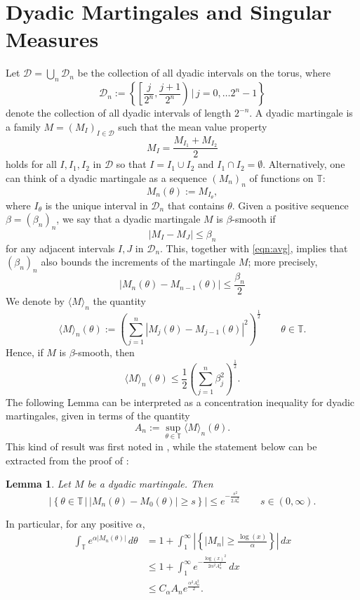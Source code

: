\documentclass{birkjour}
\numberwithin{equation}{section}
\theoremstyle{plain}
\newtheorem{lemma}[theo]{Lemma}
\theoremstyle{definition}
\newcommand{\T}{\mathbb{T}}
\newcommand{\1}{\mathds{1}}
\newcommand{\charM}{\langle M\rangle}
\newcommand{\dyad}{\mathcal{D}}
\begin{document}
\section{Dyadic Martingales and Singular Measures}
\label{sec:martingales}





Let $\mathcal{D}=\bigcup_n\dyad_n$ be the collection of all dyadic intervals on the torus, where 
\[
\mathcal{D}_n:=\left\{\left[\frac{j}{2^{n}}, \frac{j+1}{2^n}\right)\,\bigg|\, j=0, \dots 2^{n}-1\right\}
\]
denote the collection of all dyadic intervals of length $2^{-n}$. A dyadic martingale is a family $M=(M_I)_{I\in\dyad}$ such that the mean value property
\begin{equation}
\label{eqn:avg}
    M_I=\frac{M_{I_1}+M_{I_2}}{2}
\end{equation}
holds for all $I, I_1, I_2$ in $\dyad$ so that $I=I_1\cup I_2$ and $I_1 \cap I_2 = \emptyset$. Alternatively, one can think of a dyadic martingale as a sequence $(M_n)_n$ of functions on $\T$:
\[
M_n(\theta):=M_{I_\theta},
\]
where $I_\theta$ is the unique interval in $\dyad_n$ that contains $\theta$. Given a positive sequence $\beta=(\beta_n)_n$, we say that a dyadic martingale $M$ is $\beta$-smooth if
\[
|M_I-M_J|\leq \beta_n
\]
for any adjacent intervals $I, J$ in $\dyad_n$. This, together with \eqref{eqn:avg}, implies that $(\beta_n)_n$ also bounds the increments of the martingale $M$; more precisely,
\begin{equation}
\label{eqn:bddincr}
|M_n(\theta)-M_{n-1}(\theta)|\le\frac{\beta_n}{2}
\end{equation}
We denote by $\charM_n$ the quantity
\[
\charM_n(\theta):=\left(\sum_{j=1}^n\left|M_j(\theta)-M_{j-1}(\theta)\right|^2\right)^\frac{1}{2}\qquad \theta\in\T.
\]
Hence, if $M$ is $\beta$-smooth, then 
\[ 
\charM_n(\theta)\leq\frac{1}{2}\left(\sum_{j=1}^n\beta_j^2\right)^\frac{1}{2}.
\]
The following Lemma can be interpreted as a concentration inequality for dyadic martingales, given in terms of the quantity
\[
A_n:=\sup_{\theta\in\T}\charM_n(\theta).
\]
This kind of result was first noted in \cite{Chang85}, while the statement below can be extracted from the proof of \cite[Ch. 4, Lemma 7]{Seip04}:
\begin{lemma}
Let $M$ be a dyadic martingale. Then
\[
|\left\{\theta\in\T\,|\, |M_n(\theta)-M_0(\theta)|\ge s\right\}|\le e^{-\frac{s^2}{2A_n^2}}\qquad s\in (0, \infty).
\]
\end{lemma}
In particular, for any positive $\alpha$, 
\begin{equation}
\label{eqn:conc_mart}
\begin{split}
\int_\T e^{\alpha |M_n(\theta)|}\,d\theta&=1+\int_1^\infty\left|\left\{|M_n|\ge \frac{\log(x)}{\alpha}\right\}\right|\,dx\\
&\leq1+\int_1^\infty e^{-\frac{\log(x)^2}{2\alpha^2A_n^2}}\,dx\\
&\leq C_\alpha A_ne^{\frac{\alpha^2 A_n^2}{2}}.
\end{split}
\end{equation}
\end{document}
